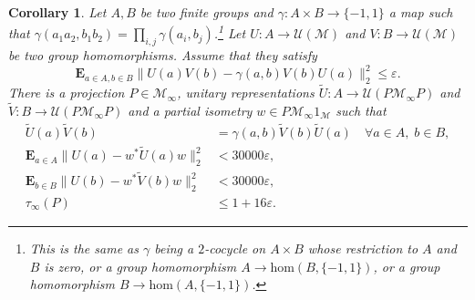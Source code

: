 \documentclass[JEP,XML,SOM,Unicode,published]{cedram}
\theoremstyle{plain}
\newtheorem{corollary}[theorem]{Corollary}
\theoremstyle{definition}
\newcommand{\cM}{\mathcal{M}}
\newcommand{\E}{\mathbf{E}}
\newcommand{\cU}{\mathcal{U}}
\begin{document}
\begin{corollary}\label{cor:averageGowersHatami_central_ext_products} Let $A,B$ be two finite groups and $\gamma:A\times B \to \{-1,1\}$ a map such that $\gamma(a_1 a_2,b_1b_2) = \prod_{i,j} \gamma(a_i, b_j)$.\footnote{This is the same as $\gamma$ being a $2$-cocycle on $A \times B$ whose restriction to $A$ and $B$ is zero, or a group homomorphism $A \to \mathrm{hom}(B,\{-1,1\})$, or a group homomorphism $B \to \mathrm{hom}(A,\{-1,1\})$.} Let $U:A \to \cU(\cM)$ and $V: B \to \cU(\cM)$ be two group homomorphisms. Assume that they satisfy
\[
\E_{a \in A,b \in B} \|U(a)V(b) - \gamma(a,b) V(b) U(a)\|_2^2 \leq \varepsilon.
\]
There is a projection $P \in \cM_\infty$, unitary representations $\tilde U:A \to \cU(P\cM_\infty P)$ and $\tilde V:B \to \cU(P\cM_\infty P)$ and a partial isometry $w \in P \cM_\infty 1_\cM$ such that
\begin{align*}
\tilde U(a) \tilde V(b) &= \gamma(a,b) \tilde V(b) \tilde U(a)\quad \forall a\in A,\; b \in B,
\\
\E_{a \in A} \|U(a)-w^* \tilde U(a) w\|_2^2&< 30000 \varepsilon,
\\
\E_{b \in B} \|U(b)-w^* \tilde V(b) w\|_2^2&< 30000 \varepsilon,
\\
\tau_\infty(P)&\leq 1+16\varepsilon.
\end{align*}
\end{corollary}
\end{document}
